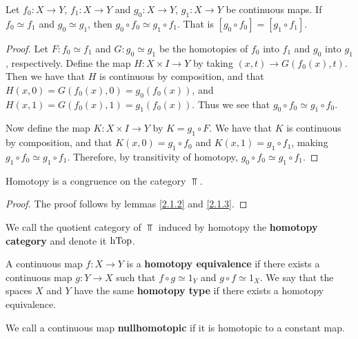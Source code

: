 \begin{lemma}\label{2.1.3}
    Let $f_0:X \xrightarrow{} Y$, $f_1:X \xrightarrow{} Y$ and $g_0:X
    \xrightarrow{} Y$, $g_1:X \xrightarrow{} Y$ be continuous maps. If $f_0
    \simeq f_1$ and $g_0 \simeq g_1$, then $g_0 \circ f_0 \simeq g_1 \circ f_1$.
    That is $[g_0 \circ f_0]=[g_1 \circ f_1]$.
\end{lemma}
\begin{proof}
    Let $F:f_0 \simeq f_1$ and $G:g_0 \simeq g_1$ be the homotopies of $f_0$
    into $f_1$ and $g_0$ into $g_1$, respectively. Define the map $H:X \times I
    \xrightarrow{} Y$ by taking $(x,t) \xrightarrow{} G(f_0(x),t)$. Then we have
    that $H$ is continuous by composition, and that
    $H(x,0)=G(f_0(x),0)=g_0(f_0(x))$, and $H(x,1)=G(f_0(x),1)=g_1(f_0(x))$. Thus
    we see that $g_0 \circ f_0 \simeq g_1 \circ f_0$.

    Now define the map $K:X \times I \xrightarrow{} Y$ by $K=g_1 \circ F$. We
    have that $K$ is continuous by composition, and that  $K(x,0)=g_1 \circ f_0$
    and $K(x,1)=g_1 \circ f_1$, making $g_1 \circ f_0 \simeq g_1 \circ f_1$.
    Therefore, by transitivity of homotopy, $g_0 \circ f_0 \simeq g_1 \circ
    f_1$.
\end{proof}

\begin{theorem}\label{2.1.4}
    Homotopy is a congruence on the category $\Top$.
\end{theorem}
\begin{proof}
    The proof follows by lemmas \ref{2.1.2} and \ref{2.1.3}.
\end{proof}

\begin{definition}
    We call the quotient category of $\Top$ induced by homotopy the
    \textbf{homotopy category} and denote it $\operatorname{hTop}$.
\end{definition}

\begin{definition}
    A continuous map $f:X \xrightarrow{} Y$ is a \textbf{homotopy equivalence}
    if there exists a continuous map $g:Y \xrightarrow{} X$ such that $f \circ
    g \simeq 1_Y$ and  $g \circ f \simeq 1_X$. We say that the spaces $X$ and
    $Y$ have the same \textbf{homotopy type} if there exists a homotopy
    equivalence.
\end{definition}

\begin{definition}
    We call a continuous map \textbf{nullhomotopic} if it is homotopic to a
    constant map.
\end{definition}

